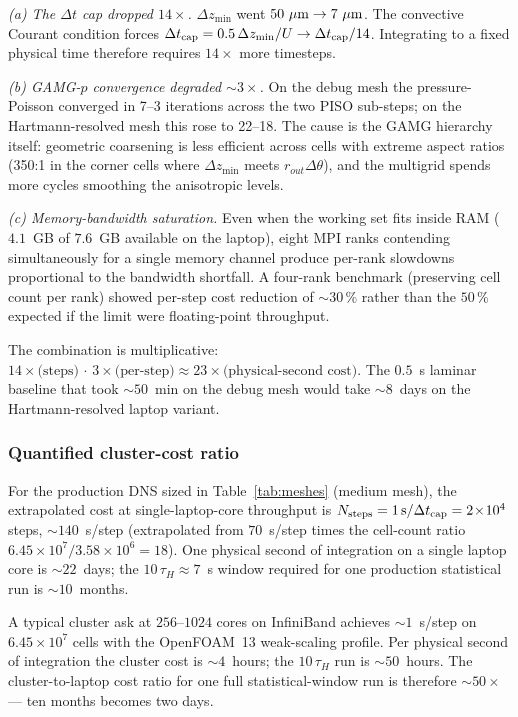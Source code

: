\documentclass[aps,prl,twocolumn,superscriptaddress]{revtex4-2}
\begin{document}
\textit{(a) The $\Delta t$ cap dropped $14\!\times$.}  $\Delta z_{\min}$
went $50~\mu\rm m\to 7~\mu m$.  The convective Courant condition
forces $\Delta t_{\rm cap} = 0.5\,\Delta z_{\min}/U \to
\Delta t_{\rm cap}/14$.  Integrating to a fixed physical time
therefore requires $14\!\times\!$ more timesteps.

\textit{(b) GAMG-$p$ convergence degraded $\sim\!3\!\times$.}  On the
debug mesh the pressure-Poisson converged in 7--3 iterations across
the two PISO sub-steps; on the Hartmann-resolved mesh this rose to
22--18.  The cause is the GAMG hierarchy itself: geometric coarsening
is less efficient across cells with extreme aspect ratios (350:1 in
the corner cells where $\Delta z_{\min}$ meets $r_{out}\Delta\theta$),
and the multigrid spends more cycles smoothing the anisotropic
levels.

\textit{(c) Memory-bandwidth saturation.}  Even when the working set
fits inside RAM ($4.1$~GB of $7.6$~GB available on the laptop), eight
MPI ranks contending simultaneously for a single memory channel
produce per-rank slowdowns proportional to the bandwidth shortfall.
A four-rank benchmark (preserving cell count per rank) showed
per-step cost reduction of $\sim\!30\,\%$ rather than the $50\,\%$
expected if the limit were floating-point throughput.

The combination is multiplicative:
$14\!\times\!\text{(steps)}\,\cdot\,3\!\times\!\text{(per-step)}
\approx 23\!\times\!\text{(physical-second cost)}$.  The $0.5$~s
laminar baseline that took $\sim\!50$~min on the debug mesh would
take $\sim\!8$~days on the Hartmann-resolved laptop variant.

\subsubsection*{Quantified cluster-cost ratio}
For the production DNS sized in Table~\ref{tab:meshes} (medium mesh),
the extrapolated cost at single-laptop-core throughput is
$N_{\rm steps} = 1\,\text{s}/\Delta t_{\rm cap} = 2\!\times\!10^{4}$
steps, $\sim\!140$~s/step (extrapolated from $70$~s/step times the
cell-count ratio $6.45\!\times\!10^{7}/3.58\!\times\!10^{6} = 18$).
One physical second of integration on a single laptop core is
$\sim\!22$~days; the $10\,\tau_H\!\approx\!7$~s window required for
one production statistical run is $\sim\!10$~months.

A typical cluster ask at $256$--$1024$ cores on InfiniBand achieves
$\sim\!1$~s/step on $6.45\!\times\!10^{7}$ cells with the OpenFOAM~13
weak-scaling profile.  Per physical second of integration the
cluster cost is $\sim\!4$~hours; the $10\,\tau_H$ run is
$\sim\!50$~hours.  The cluster-to-laptop cost ratio for one full
statistical-window run is therefore $\sim\!50\!\times$ --- ten
months becomes two days.
\end{document}
